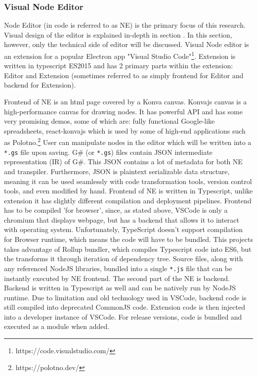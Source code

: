 \documentclass{article}
\begin{document}
\subsubsection{Visual Node Editor}
Node Editor (in code is referred to as NE) is the primary focus of this research. Visual design of the editor is explained in-depth in section . In this section, however, only the technical side of editor will be discussed.
Visual Node editor is an extension for a popular Electron app "Visual Studio Code"\footnote{https://code.visualstudio.com/}. Extension is written in typescript ES2015 and has 2 primary parts within the extension: Editor and Extension (sometimes referred to as simply frontend for Editor and backend for Extension).

Frontend of NE is an html page covered by a Konva canvas. Konvajs canvas is a high-performance canvas for drawing nodes. It has powerful API and has some very promising demos, some of which are: fully functional Google-like spreadsheets, react-konvajs which is used by some of high-end applications such as Polotno.\footnote{https://polotno.dev/}
User can manipulate nodes in the editor which will be written into a \lstinline[columns=fixed]{*.gs} file upon saving. G\# (or \lstinline[columns=fixed]{*.gs}) files contain JSON intermediate representation (IR) of G\#. This JSON contains a lot of metadata for both NE and transpiler. Furthermore, JSON is plaintext serializable data structure, meaning it can be used seamlessly with code transformation tools, version control tools, and even modified by hand.
Frontend of NE is written in Typescript, unlike extension it has slightly different compilation and deployment pipelines. Frontend has to be compiled 'for browser', since, as stated above, VSCode is only a chromium that displays webpage, but has a backend that allows it to interact with operating system. Unfortunately, TypeScript doesn't support compilation for Browser runtime, which means the code will have to be bundled. This projects takes advantage of Rollup bundler, which compiles Typescript code into ES6, but the transforms it through iteration of dependency tree. Source files, along with any referenced NodeJS libraries, bundled into a single \lstinline[columns=fixed]{*.js} file that can be instantly executed by NE frontend.
The second part of the NE is backend. Backend is written in Typescript as well and can be natively run by NodeJS runtime. Due to limitation and old technology used in VSCode, backend code is still compiled into deprecated CommonJS code. Extension code is then injected into a developer instance of VSCode. For release versions, code is bundled and executed as a module when added.
\end{document}
